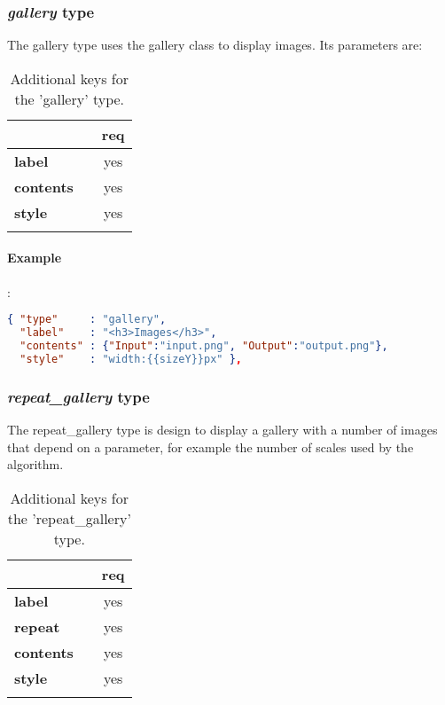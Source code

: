 \subsubsection{ \emph{gallery} type}

The gallery type uses the gallery class to display images. Its parameters are:

\begin{longtable}{|>{\bf}L{\linewidth}|L{\linewidth}|c|}
\hline
      &  & {\bf req} 
\tabularnewline \hline \hline
 label      & & yes \\ \hline
 contents   & & yes \\ \hline
 style      & & yes \\ \hline
\caption{Additional keys for the 'gallery' type.}
\end{longtable}

\paragraph{Example}:\\
\begin{lstlisting}[language=json,firstnumber=1]
{ "type"     : "gallery",
  "label"    : "<h3>Images</h3>",
  "contents" : {"Input":"input.png", "Output":"output.png"},
  "style"    : "width:{{sizeY}}px" },
\end{lstlisting}

\subsubsection{ \emph{repeat\_gallery} type}
The repeat\_gallery type is design to display a gallery with a number of images 
that depend on a parameter, for example the number of scales used by the 
algorithm.

\begin{longtable}{|>{\bf}L{\linewidth}|L{\linewidth}|c|}
\hline
{}     &  & {\bf req} \tabularnewline 
\hline \hline
 label      & & yes \\ \hline
 repeat     & & yes \\ \hline
 contents   & & yes \\ \hline
 style      & & yes \\ \hline
\caption{Additional keys for the 'repeat\_gallery' type.}
\end{longtable}

